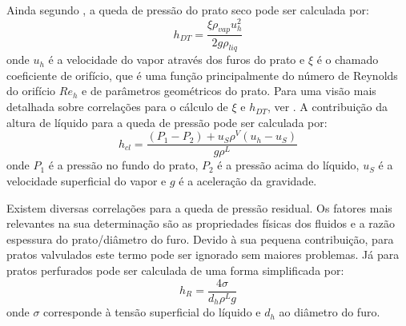 Ainda segundo , a queda de pressão do prato seco pode ser calculada por:
\begin{equation}
h_{DT} = \dfrac{\xi \rho_{vap} u^2_ h}{2 g \rho_{liq}}
\end{equation}
onde $u_ h$ é a velocidade do vapor através dos furos do prato e $\xi$ é o chamado coeficiente de orifício,
que é uma função principalmente do número de Reynolds do orifício $Re_h$
e de parâmetros geométricos do prato. Para uma visão mais detalhada sobre correlações para o cálculo de $\xi$ e $h_{DT}$,
ver .
A contribuição da altura de líquido para a queda de pressão pode ser calculada por:
\begin{equation}
h_{cl} = \dfrac{\left( P_1 - P_2\right) + u_S \rho^V \left(u_h - u_S \right) }{g \rho^L}
\end{equation}
onde $P_1$ é a pressão no fundo do prato, $P_2$ é a pressão acima do líquido,
$u_ S$ é a velocidade superficial do vapor e $g$ é a aceleração da gravidade.

Existem diversas correlações para a queda de pressão residual. Os fatores mais relevantes na sua determinação
são as propriedades físicas dos fluidos e a razão espessura do prato/diâmetro do furo. Devido à sua pequena
contribuição, para pratos valvulados este termo pode ser ignorado sem maiores problemas. Já para pratos perfurados
pode ser calculada de uma forma simplificada por:
\begin{equation}
h_{R} = \dfrac{4\sigma }{d_h \rho^L g}
\end{equation}
onde $\sigma$ corresponde à tensão superficial do líquido e $d_h$ ao diâmetro do furo.

